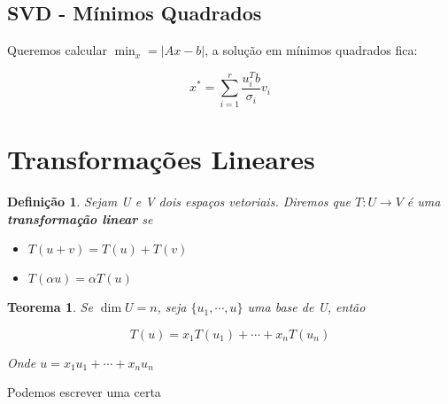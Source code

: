 \documentclass[12pt]{article}
\newtheorem{theorem}{Teorema}
\newtheorem{definition}{Definição}
\begin{document}
\subsection*{SVD - Mínimos Quadrados}
Queremos calcular $\min_x = |A x - b|$, a solução em mínimos quadrados fica:

$$x^* = \sum_{i = 1}^r \dfrac{u_i^T b}{\sigma_i} v_i$$

\section*{Transformações Lineares}
\label{s5}
\begin{definition}
    Sejam U e V dois espaços vetoriais. Diremos que $T: U \rightarrow V$ é uma \textbf{transformação linear} se
    
    \begin{itemize}
        \item $T(u + v) = T(u) + T(v)$
        
        \item $T(\alpha u) = \alpha T(u)$
    \end{itemize}
\end{definition}

\begin{theorem}
    Se $\dim U = n$, seja $\{u_1, \cdots, u \}$ uma base de U, então
    
    $$T(u) = x_1 T(u_1) + \cdots + x_n T(u_n)$$
    
    Onde $u = x_1 u_1 + \cdots + x_n u_n$
\end{theorem}

Podemos escrever uma certa 

\end{document}
